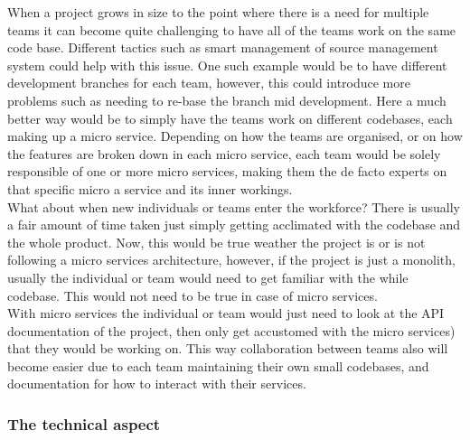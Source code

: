 \documentclass{article}
\newcommand{\vspaceconst}{-2ex}
\begin{document}
\begin{multicols}{2}
When a project grows in size to the point where there is a need for multiple teams it can become quite challenging to have all of the teams work on the same code base. Different tactics such as smart management of source management system could help with this issue. One such example would be to have different development branches for each team, however, this could introduce more problems such as needing to re-base the branch mid development. Here a much better way would be to simply have the teams work on different codebases, each making up a micro service. Depending on how the teams are organised, or on how the features are broken down in each micro service, each team would be solely responsible of one or more micro services, making them the de facto experts on that specific micro a service and its inner workings.\\
What about when new individuals or teams enter the workforce? There is usually a fair amount of time taken just simply getting acclimated with the codebase and the whole product. Now, this would be true weather the project is or is not following a micro services architecture, however, if the project is just a monolith, usually the individual or team would need to get familiar with the while codebase. This would not need to be true in case of micro services.\\
With micro services the individual or team would just need to look at the API documentation of the project, then only get accustomed with the micro services) that they would be working on. This way collaboration between teams also will become easier due to each team maintaining their own small codebases, and documentation for how to interact with their services.\\

\subsubsection{The technical aspect}
\vspace{\vspaceconst}


\end{multicols}
\end{document}
